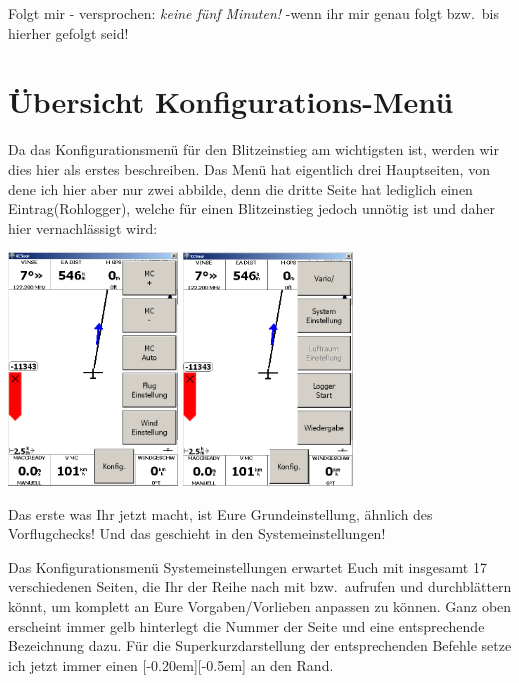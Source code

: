 Folgt mir -  versprochen:  \textsl{keine fünf Minuten!} -wenn ihr mir genau folgt bzw.\ bis hierher gefolgt seid!
%
\section{Übersicht Konfigurations-Menü}\label{Blitz-Konfig}
Da das Konfigurationsmenü für den Blitzeinstieg am wichtigsten ist, werden wir dies hier als erstes beschreiben. Das Menü hat eigentlich drei Hauptseiten, von dene ich hier aber nur zwei abbilde, denn die dritte Seite hat lediglich einen Eintrag(\textsf{Rohlogger}), welche für einen Blitzeinstieg jedoch unnötig ist und daher hier vernachlässigt wird:
\begin{center}
\includegraphics[width=4.5cm]{Bilder/HauptmenueKonfig1.png}%
\qquad\qquad\includegraphics[width=4.5cm]{Bilder/HauptmenueKonfig2.png}
\end{center}

Das erste was Ihr jetzt macht, ist Eure Grundeinstellung, ähnlich des Vorflugchecks! Und das geschieht in den \textsf{Systemeinstellungen}!

Das Konfigurationsmenü \textsf{ Systemeinstellungen} erwartet Euch mit insgesamt 17 verschiedenen Seiten, die Ihr der Reihe nach mit \fal bzw.\ \far aufrufen und durchblättern könnt, um  \xc komplett an Eure Vorgaben/Vorlieben anpassen zu können. Ganz oben erscheint immer gelb hinterlegt die Nummer der Seite und eine entsprechende Bezeichnung dazu. Für die Superkurzdarstellung der entsprechenden Befehle setze ich jetzt immer einen \raisebox{0mm}[-0.20em][-0.5em]{\smallblitz} an den Rand.\\

